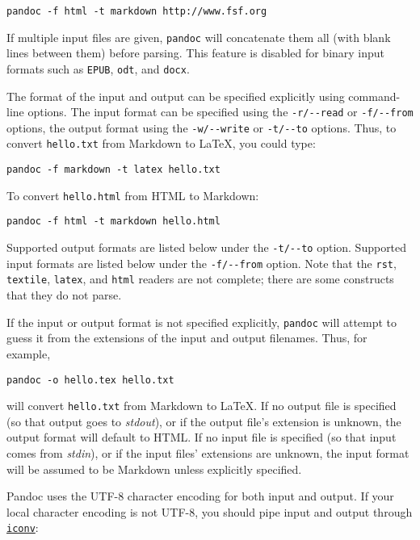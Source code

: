 \documentclass[]{article}
\begin{document}
\begin{verbatim}
pandoc -f html -t markdown http://www.fsf.org
\end{verbatim}

If multiple input files are given, \texttt{pandoc} will concatenate them
all (with blank lines between them) before parsing. This feature is
disabled for binary input formats such as \texttt{EPUB}, \texttt{odt},
and \texttt{docx}.

The format of the input and output can be specified explicitly using
command-line options. The input format can be specified using the
\texttt{-r/-\/-read} or \texttt{-f/-\/-from} options, the output format
using the \texttt{-w/-\/-write} or \texttt{-t/-\/-to} options. Thus, to
convert \texttt{hello.txt} from Markdown to LaTeX, you could type:

\begin{verbatim}
pandoc -f markdown -t latex hello.txt
\end{verbatim}

To convert \texttt{hello.html} from HTML to Markdown:

\begin{verbatim}
pandoc -f html -t markdown hello.html
\end{verbatim}

Supported output formats are listed below under the \texttt{-t/-\/-to}
option. Supported input formats are listed below under the
\texttt{-f/-\/-from} option. Note that the \texttt{rst},
\texttt{textile}, \texttt{latex}, and \texttt{html} readers are not
complete; there are some constructs that they do not parse.

If the input or output format is not specified explicitly,
\texttt{pandoc} will attempt to guess it from the extensions of the
input and output filenames. Thus, for example,

\begin{verbatim}
pandoc -o hello.tex hello.txt
\end{verbatim}

will convert \texttt{hello.txt} from Markdown to LaTeX. If no output
file is specified (so that output goes to \emph{stdout}), or if the
output file's extension is unknown, the output format will default to
HTML. If no input file is specified (so that input comes from
\emph{stdin}), or if the input files' extensions are unknown, the input
format will be assumed to be Markdown unless explicitly specified.

Pandoc uses the UTF-8 character encoding for both input and output. If
your local character encoding is not UTF-8, you should pipe input and
output through
\href{http://www.gnu.org/software/libiconv/}{\texttt{iconv}}:
\end{document}

